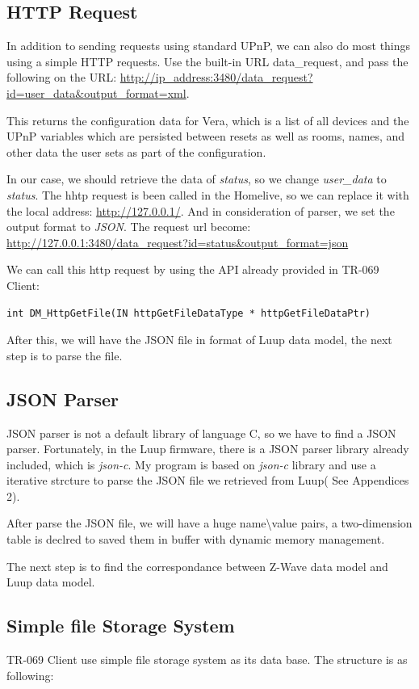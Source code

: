 \subsection{HTTP Request}
In addition to sending requests using standard UPnP, we can also do most things using a simple HTTP requests. Use the built-in URL data_request, and pass the following on the URL: \url{http://ip_address:3480/data_request?id=user_data&output_format=xml}.

This returns the configuration data for Vera, which is a list of all devices and the UPnP variables which are persisted between resets as well as rooms, names, and other data the user sets as part of the configuration.

In our case, we should retrieve the data of \textit{status}, so we change \textit{user_data} to \textit{status}. The hhtp request is been called in the Homelive, so we can replace it with the local address: \url{http://127.0.0.1/}. And in consideration of parser, we set the output format to \textit{JSON}. The request url become:\\
\url{http://127.0.0.1:3480/data_request?id=status&output_format=json}

We can call this http request by using the API already provided in TR-069 Client:
\begin{lstlisting}[mathescape]
    int DM_HttpGetFile(IN httpGetFileDataType * httpGetFileDataPtr)
\end{lstlisting}

After this, we will have the JSON file in format of Luup data model, the next step is to parse the file.

\subsection{JSON Parser}
JSON parser is not a default library of language C, so we have to find a JSON parser. Fortunately, in the Luup firmware, there is a JSON parser library already included, which is \textit{json-c}. My program is based on \textit{json-c} library and use a iterative strcture to parse the JSON file we retrieved from Luup( See Appendices 2).

After parse the JSON file, we will have a huge name\textbackslash value pairs, a two-dimension table is declred to saved them in buffer with dynamic memory management.

The next step is to find the correspondance between Z-Wave data model and Luup data model.

\subsection{Simple file Storage System}
TR-069 Client use simple file storage system as its data base. The structure is as following:

